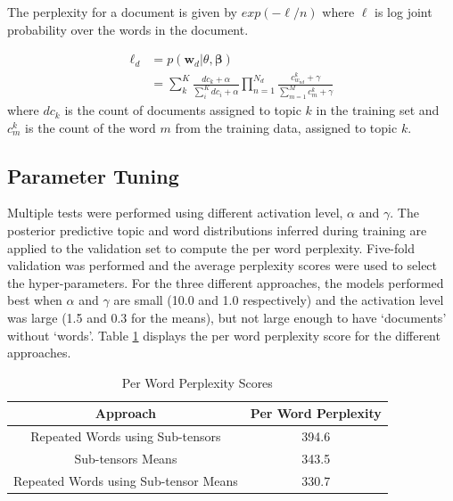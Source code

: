 \documentclass{article}
\begin{document}
The perplexity for a document is given by $exp(-\ell/n)$ where $\ell$ is log joint probability over the words in the document.

\vspace{-0.5cm}
\begin{equation}
\begin{split}
\ell_d &= p(\bm{w}_d | \theta, \bm{\beta}) \\
 & = \sum_k^K \frac{dc_k + \alpha}{\sum_i^K dc_i + \alpha}\prod_{n=1}^{N_d} \frac{c_{w_{nd}}^k + \gamma}{\sum_{m=1}^M c_m^k + \gamma}
\end{split}
\end{equation}
where $dc_k$ is the count of documents assigned to topic $k$ in the training set and $c_m^k$ is the count of the word $m$ from the training data, assigned to topic $k$. 

\subsection{Parameter Tuning} \label{params}
Multiple tests were performed using different activation level, $\alpha$ and $\gamma$. The posterior predictive topic and word distributions inferred during training are applied to the validation set to compute the per word perplexity. Five-fold validation was performed and the average perplexity scores were used to select the hyper-parameters. For the three different approaches, the models performed best when $\alpha$ and $\gamma$ are small (10.0 and 1.0 respectively) and the activation level was large (1.5 and 0.3 for the means), but not large enough to have `documents' without `words'. Table \ref{tab:perplexity} displays the per word perplexity score for the different approaches. 

\begin{table}[h]
\caption{Per Word Perplexity Scores}
\label{tab:perplexity}
\centering
\begin{tabular}{|c|c|}
\hline
Approach                              & \multicolumn{1}{l|}{Per Word Perplexity} \\ \hline
Repeated Words using Sub-tensors      & 394.6                                    \\
Sub-tensors Means                     & 343.5                                    \\
Repeated Words using Sub-tensor Means & 330.7                                    \\ \hline
\end{tabular}
\end{table}
\end{document}
